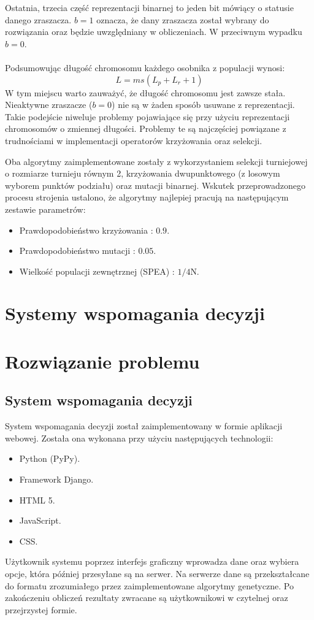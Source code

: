 \documentclass[twoside]{iisthesis}
\begin{document}
Ostatnia, trzecia część reprezentacji binarnej to jeden bit mówiący o statusie danego zraszacza. $b = 1$ oznacza, że dany zraszacza został wybrany do rozwiązania oraz będzie uwzględniany w obliczeniach. W przeciwnym wypadku $b = 0$.\\\\
Podsumowując długość chromosomu każdego osobnika z populacji wynosi:
\begin{equation}
	L = ms(L_{p} + L_{r} + 1)
\end{equation}
W tym miejscu warto zauważyć, że długość chromosomu jest zawsze stała. Nieaktywne zraszacze ($b=0$) nie są w żaden sposób usuwane z reprezentacji. Takie podejście niweluje problemy pojawiające się przy użyciu reprezentacji chromosomów o zmiennej długości. Problemy te są najczęściej powiązane z trudnościami w implementacji operatorów krzyżowania oraz selekcji.

Oba algorytmy zaimplementowane zostały z wykorzystaniem selekcji turniejowej o rozmiarze turnieju równym 2, krzyżowania dwupunktowego (z losowym wyborem punktów podziału) oraz mutacji binarnej. Wskutek przeprowadzonego procesu strojenia ustalono, że algorytmy najlepiej pracują na następującym zestawie parametrów:\\
\begin{itemize}
	\item Prawdopodobieństwo krzyżowania : $0.9$.
	\item Prawdopodobieństwo mutacji : $0.05$.
	\item Wielkość populacji zewnętrznej (SPEA) : $1/4$N.
\end{itemize}

\chapter{Systemy wspomagania decyzji}

\chapter{Rozwiązanie problemu}
\section{System wspomagania decyzji}
System wspomagania decyzji został zaimplementowany w formie aplikacji webowej. Została ona wykonana przy użyciu następujących technologii:\\
\begin{itemize}
	\item Python (PyPy).
	\item Framework Django.
	\item HTML 5.
	\item JavaScript.
	\item CSS.\\
\end{itemize} 
Użytkownik systemu poprzez interfejs graficzny wprowadza dane oraz wybiera opcje, która później przesyłane są na serwer. Na serwerze dane są przekształcane do formatu zrozumiałego przez zaimplementowane algorytmy genetyczne. Po zakończeniu obliczeń rezultaty zwracane są użytkownikowi w czytelnej oraz przejrzystej formie.
\end{document}
